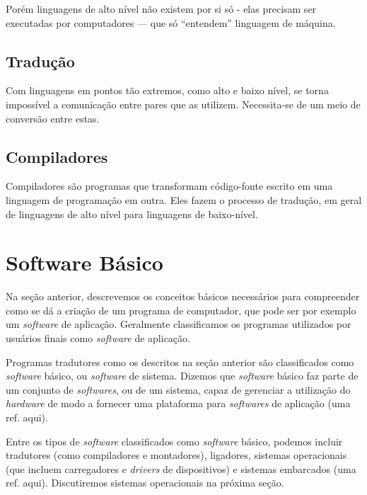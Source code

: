 Porém linguagens de alto nível não existem por si só - elas precisam ser
executadas por computadores --- que só ``entendem'' linguagem de máquina.

\subsection{Tradução}

Com linguagens em pontos tão extremos, como alto e baixo nível, se torna
impossível a comunicação entre pares que as utilizem. Necessita-se de um meio de
conversão entre estas.



\subsection{Compiladores}

Compiladores são programas que transformam código-fonte escrito em uma linguagem
de programação em outra. Eles fazem o processo de tradução, em geral de
linguagens de alto nível para linguagens de baixo-nível.

\section{Software Básico}
\label{sec:software_basico}

Na seção anterior, descrevemos os conceitos básicos necessários para compreender
como se dá a criação de um programa de computador, que pode ser por exemplo um
\textit{software} de aplicação. Geralmente classificamos os programas utilizados
por usuários finais como \textit{software} de aplicação.

Programas tradutores como os descritos na seção anterior são classificados como
\textit{software} básico, ou \textit{software} de sistema. Dizemos que
\textit{software} básico faz parte de um conjunto de \textit{softwares}, ou de
um sistema, capaz de gerenciar a utilização do \textit{hardware} de modo a
fornecer uma plataforma para \textit{softwares} de aplicação (uma ref. aqui).

Entre os tipos de \textit{software} classificados como \textit{software} básico,
podemos incluir tradutores (como compiladores e montadores), ligadores, sistemas
operacionais (que incluem carregadores e \textit{drivers} de dispositivos) e
sistemas embarcados (uma ref. aqui). Discutiremos sistemas operacionais na
próxima seção.

